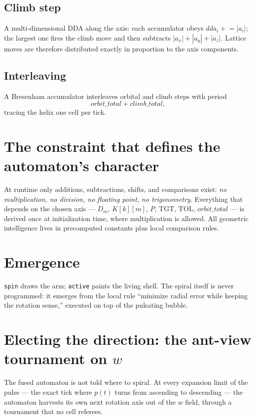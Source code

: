 \documentclass[11pt,a4paper]{article}
\begin{document}
\subsection{Climb step}
A multi-dimensional DDA along the axis: each accumulator obeys
$\mathit{dda}_i \mathrel{+}= |a_i|$; the largest one fires the climb move
and then subtracts $|a_x| + |a_y| + |a_z|$. Lattice moves are therefore
distributed exactly in proportion to the axis components.

\subsection{Interleaving}
A Bresenham accumulator interleaves orbital and climb steps with period
\begin{equation}
\mathit{orbit\_total} + \mathit{climb\_total},
\end{equation}
tracing the helix one cell per tick.

\section{The constraint that defines the automaton's character}
At runtime only additions, subtractions, shifts, and comparisons exist:
\emph{no multiplication, no division, no floating point, no trigonometry}.
Everything that depends on the chosen axis --- $D_m$, $K[k][m]$, $P$,
$\mathrm{TGT}$, $\mathrm{TOL}$, $\mathit{orbit\_total}$ --- is derived once
at initialization time, where multiplication is allowed. All geometric
intelligence lives in precomputed constants plus local comparison rules.

\section{Emergence}
\texttt{spin} draws the arm; \texttt{active} paints the living shell.
The spiral itself is never programmed: it emerges from the local rule
``minimize radial error while keeping the rotation sense,'' executed on
top of the pulsating bubble.

\section{Electing the direction: the ant-view tournament on $w$}
\label{sec:election}

The fused automaton is not told where to spiral. At every expansion
limit of the pulse --- the exact tick where $p(t)$ turns from ascending
to descending --- the automaton harvests its own next rotation axis out
of the $w$ field, through a tournament that no cell referees.
\end{document}
